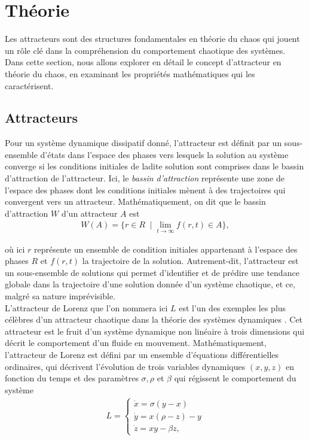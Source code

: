 \section{Théorie} \label{sec: theory}
    Les attracteurs sont des structures fondamentales en théorie du chaos qui jouent un rôle clé dans la compréhension du comportement chaotique des systèmes. Dans cette section, nous allons explorer en détail le concept d'attracteur en théorie du chaos, en examinant les propriétés mathématiques qui les caractérisent. 

\subsection{Attracteurs} \label{subsec: attractors}
    Pour un système dynamique dissipatif donné, l'attracteur est définit par un sous-ensemble d'états dans l'espace des phases vers lesquels la solution au système converge si les conditions initiales de ladite solution sont comprises dans le bassin d'attraction de l'attracteur. Ici, le \textit{bassin d'attraction} représente une zone de l'espace des phases dont les conditions initiales mènent à des trajectoires qui convergent vers un attracteur. Mathématiquement, on dit que le bassin d'attraction $W$ d'un attracteur $A$ est
    \begin{align}
        W(A) = \{r\in R\;\;|\;\lim_{t\to\infty} f(r, t)\in A\},
    \end{align}

    où ici $r$ représente un ensemble de condition initiales appartenant à l'espace des phases $R$ et $f(r, t)$ la trajectoire de la solution. Autrement-dit, l'attracteur est un sous-ensemble de solutions qui permet d'identifier et de prédire une tendance globale dans la trajectoire d'une solution donnée d'un système chaotique, et ce, malgré sa nature imprévisible. \\

    L'attracteur de Lorenz que l'on nommera ici $L$ est l'un des exemples les plus célèbres d'un attracteur chaotique dans la théorie des systèmes dynamiques \cite{lorenz}. Cet attracteur est le fruit d'un système dynamique non linéaire à trois dimensions qui décrit le comportement d'un fluide en mouvement. Mathématiquement, l'attracteur de Lorenz est défini par un ensemble d'équations différentielles ordinaires, qui décrivent l'évolution de trois variables dynamiques $(x, y, z)$ en fonction du temps et des paramètres $\sigma, \rho$ et $\beta$ qui régissent le comportement du système
    \begin{align}
        L = \left\{
        \begin{array}{c}
           \Dot{x} = \sigma(y - x) \\
           \Dot{y} = x(\rho - z) - y \\
           \Dot{z} = xy - \beta z, 
        \end{array}
        \right.
        \label{eq : lorenz}
    \end{align}


